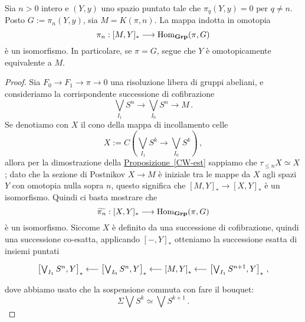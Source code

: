 	
	\begin{lemma}
		Sia $n > 0$ intero e $(Y,y)$ uno spazio puntato tale che $\pi_{q}(Y,y)=0$
		per $q \ne n$. Posto $G := \pi_{n}(Y,y)$, sia $M = K(\pi,n)$.
		La mappa indotta in omotopia
		\begin{equation*}
			\pi_{n} : [M,Y]_{\ast} \longrightarrow \operatorname{Hom}_{{\normalfont\textbf{Grp}}}(\pi,G)
		\end{equation*}
		è un isomorfismo. In particolare, se $\pi=G$, segue che $Y$
		è omotopicamente equivalente a $M$.
		\begin{proof}
			Sia $F_{0} \to F_{1} \to \pi \to 0$ una risoluzione libera di gruppi abeliani,
			e consideriamo la corrispondente successione di cofibrazione
			\begin{equation*}
				\bigvee_{I_{1}} S^{n} \longrightarrow
				\bigvee_{I_{0}} S^{n} \longrightarrow
				M\,.
			\end{equation*}
			Se denotiamo con $X$ il cono della mappa di incollamento celle
			\begin{equation*}
				X := C\left( \bigvee_{I_{1}} S^{k} \to \bigvee_{I_{0}} S^{k} \right)\,,
			\end{equation*}
			allora per la dimostrazione della \hyperref[CW-est]{Proposizione~\ref{CW-est}}
			sappiamo che $\tau_{\le n} X \simeq X$; dato che la sezione
			di Postnikov $X \to M$ è iniziale tra le mappe da $X$
			agli spazi $Y$ con omotopia nulla sopra $n$,
			questo significa che $[M,Y]_{\ast} \to [X,Y]_{\ast}$ è un isomorfismo.
			Quindi ci basta mostrare che
			\begin{equation*}
				\widetilde{\pi_{n}} : [X,Y]_{\ast} \longrightarrow \operatorname{Hom}_{{\normalfont\textbf{Grp}}}(\pi,G)
			\end{equation*}
			è un isomorfismo.
			Siccome $X$ è definito da una successione di cofibrazione,
			quindi una successione co-esatta, applicando $[-,Y]_{\ast}$
			otteniamo la successione esatta di insiemi puntati
			\begin{equation*}
				\begin{tikzcd}
					\left[ \bigvee_{I_{1}} S^{n},  Y\right]_{\ast} \longleftarrow
					\left[ \bigvee_{I_{0}} S^{n}, Y \right]_{\ast} \longleftarrow
					\left[ M, Y \right]_{\ast} \longleftarrow
					\left[ \bigvee_{I_{1}} S^{n+1},  Y\right]_{\ast}\,,
				\end{tikzcd}
			\end{equation*}
			dove abbiamo usato che la sospensione commuta con fare il bouquet:
			\begin{equation*}
				\Sigma \bigvee S^{k} \simeq \bigvee S^{k+1}\,.

\end{equation*}
\end{proof}
\end{lemma}
